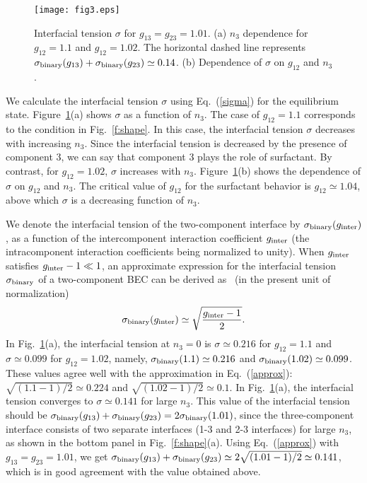 \documentclass[pra,aps,superscriptaddress,twocolumn,color]{revtex4-1}
\begin{document}
\begin{figure}[tb]
\texttt{[image: fig3.eps]}
\caption{
  Interfacial tension $\sigma$ for $g_{13} = g_{23} = 1.01$.
  (a) $n_3$ dependence for $g_{12} = 1.1$ and $g_{12} = 1.02$.
  The horizontal dashed line represents $\sigma_{\rm binary}(g_{13})
  + \sigma_{\rm binary}(g_{23}) \simeq 0.14$.
  (b) Dependence of $\sigma$ on $g_{12}$ and $n_3$.
}
\label{f:sigma}
\end{figure}
We calculate the interfacial tension $\sigma$ using Eq.~(\ref{sigma}) for
the equilibrium state.
Figure~\ref{f:sigma}(a) shows $\sigma$ as a function of $n_3$.
The case of $g_{12} = 1.1$ corresponds to the condition in
Fig.~\ref{f:shape}.
In this case, the interfacial tension $\sigma$ decreases with increasing
$n_3$.
Since the interfacial tension is decreased by the presence of component 3,
we can say that component 3 plays the role of surfactant.
By contrast, for $g_{12} = 1.02$, $\sigma$ increases with $n_3$.
Figure~\ref{f:sigma}(b) shows the dependence of $\sigma$ on $g_{12}$ and
$n_3$.
The critical value of $g_{12}$ for the surfactant behavior is $g_{12} \simeq
1.04$, above which $\sigma$ is a decreasing function of $n_3$.

We denote the interfacial tension of the two-component interface by
$\sigma_{\rm binary}(g_{\rm inter})$, as a function of the intercomponent
interaction coefficient $g_{\rm inter}$ (the intracomponent interaction
coefficients being normalized to unity).
When $g_{\rm inter}$ satisfies $g_{\rm inter} - 1 \ll 1$, an approximate
expression for the interfacial tension $\sigma_{\rm binary}$ of a
two-component BEC can be derived as~\cite{Ao, Barankov, Schae}
(in the present unit of normalization)
\begin{equation} \label{approx}
  \sigma_{\rm binary}(g_{\rm inter}) \simeq
  \sqrt{\frac{g_{\rm inter} - 1}{2}}.
\end{equation}
In Fig.~\ref{f:sigma}(a), the interfacial tension at $n_3 = 0$ is $\sigma
\simeq 0.216$ for $g_{12} = 1.1$ and $\sigma \simeq 0.099$ for $g_{12} =
1.02$, namely, $\sigma_{\rm binary}(1.1) \simeq 0.216$ and
$\sigma_{\rm binary}(1.02) \simeq 0.099$.
These values agree well with the approximation in Eq.~(\ref{approx}):
$\sqrt{(1.1 - 1) / 2} \simeq 0.224$ and
$\sqrt{(1.02 - 1) / 2} \simeq 0.1$.
In Fig.~\ref{f:sigma}(a), the interfacial tension converges to $\sigma
\simeq 0.141$ for large $n_3$.
This value of the interfacial tension should be $\sigma_{\rm binary}(g_{13})
+ \sigma_{\rm binary}(g_{23}) = 2\sigma_{\rm binary}(1.01)$, since the
three-component interface consists of two separate interfaces (1-3 and 2-3
interfaces) for large $n_3$, as shown in the bottom panel in
Fig.~\ref{f:shape}(a).
Using Eq.~(\ref{approx}) with $g_{13} = g_{23} = 1.01$, we get
$\sigma_{\rm binary}(g_{13}) + \sigma_{\rm binary}(g_{23}) \simeq 2
\sqrt{(1.01 - 1) / 2} \simeq 0.141$, which is in good agreement with the
value obtained above.
\end{document}
